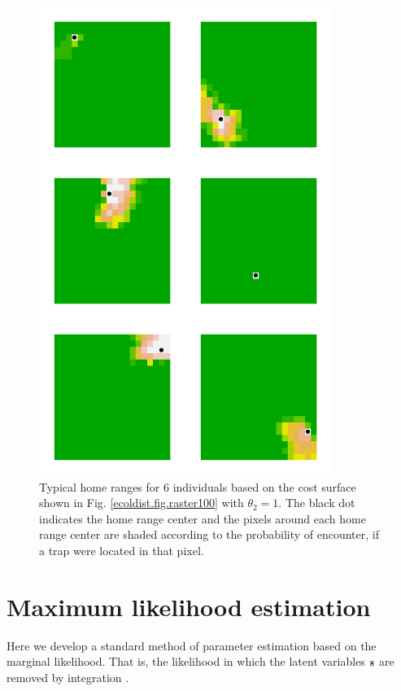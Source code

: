 \documentclass[12pt]{article}
\begin{document}
\begin{figure}
\begin{center}
\includegraphics[height=6in,width=3.75in]{figs/home_ranges}
\end{center}
\caption{
Typical home ranges for 6 individuals based on the cost surface shown in
  Fig. \ref{ecoldist.fig.raster100} with $\theta_{2}=1$. The black dot indicates the home
  range center and the pixels around each home range center are shaded
according to the probability of encounter, if a trap were located in
that pixel. 
}
\label{fig.homeranges}
\end{figure}




\section{Maximum likelihood estimation}
\label{sec.mle}

Here we develop a standard method of parameter estimation based on
the marginal likelihood. That is, the likelihood in which the latent
variables ${\bf s}$ are removed by integration \citep{borchers_efford:2008}.
\end{document}
